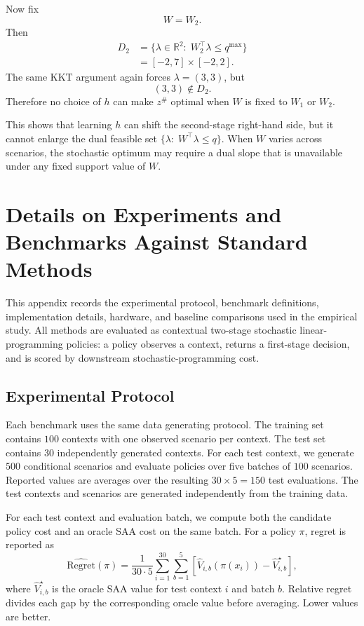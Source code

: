 \documentclass{article}
\newcommand{\R}{\mathbb{R}}
\newcommand{\1}{\mathbf{1}}
\theoremstyle{plain}
\theoremstyle{definition}
\theoremstyle{remark}
\begin{document}
Now fix
\[
W=W_2.
\]
Then
\[
\begin{aligned}
D_2
&=\{\lambda\in\R^2:\; W_2^\top\lambda\leq q^{\max}\}\\
&=[-2,7]\times[-2,2].
\end{aligned}
\]
The same KKT argument again forces $\lambda=(3,3)$, but
\[
(3,3)\notin D_2.
\]
Therefore no choice of $h$ can make $z^\#$ optimal when $W$ is fixed to $W_1$ or $W_2$.

This shows that learning $h$ can shift the second-stage right-hand side, but it cannot enlarge the dual feasible set $\{\lambda:\; W^\top\lambda\leq q\}$. When $W$ varies across scenarios, the stochastic optimum may require a dual slope that is unavailable under any fixed support value of $W$.

\section{Details on Experiments and Benchmarks Against Standard Methods}
\label{app:details-experiments-benchmarks}

This appendix records the experimental protocol, benchmark definitions, implementation details, hardware, and baseline comparisons used in the empirical study. All methods are evaluated as contextual two-stage stochastic linear-programming policies: a policy observes a context, returns a first-stage decision, and is scored by downstream stochastic-programming cost.

\subsection{Experimental Protocol}

Each benchmark uses the same data generating protocol. The training set contains $100$ contexts with one observed scenario per context. The test set contains $30$ independently generated contexts. For each test context, we generate $500$ conditional scenarios and evaluate policies over five batches of $100$ scenarios. Reported values are averages over the resulting $30\times 5=150$ test evaluations. The test contexts and scenarios are generated independently from the training data.

For each test context and evaluation batch, we compute both the candidate policy cost and an oracle SAA cost on the same batch. For a policy $\pi$, regret is reported as
\[
\widehat{\mathrm{Regret}}(\pi)
=
\frac{1}{30\cdot 5}
\sum_{i=1}^{30}
\sum_{b=1}^{5}
\left[
\widehat V_{i,b}(\pi(x_i))-\widehat V_{i,b}^{\star}
\right],
\]
where $\widehat V_{i,b}^{\star}$ is the oracle SAA value for test context $i$ and batch $b$. Relative regret divides each gap by the corresponding oracle value before averaging. Lower values are better.
\end{document}

